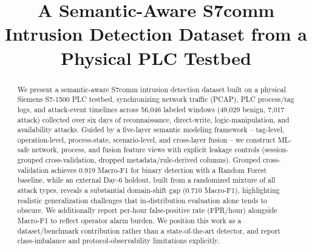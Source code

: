 \documentclass[conference]{IEEEtran}
\begin{document}
\title{A Semantic-Aware S7comm Intrusion Detection Dataset from a Physical PLC Testbed\\}

\author{
\and
{}
\and
{}
}

\maketitle

\begin{abstract}
We present a semantic-aware S7comm intrusion detection dataset built on a physical Siemens S7-1500 PLC testbed, synchronizing network traffic (PCAP), PLC process/tag logs, and attack-event timelines across 56{,}046 labeled windows (49{,}029 benign, 7{,}017 attack) collected over six days of reconnaissance, direct-write, logic-manipulation, and availability attacks. Guided by a five-layer semantic modeling framework -- tag-level, operation-level, process-state, scenario-level, and cross-layer fusion -- we construct ML-safe network, process, and fusion feature views with explicit leakage controls (session-grouped cross-validation, dropped metadata/rule-derived columns). Grouped cross-validation achieves 0.919 Macro-F1 for binary detection with a Random Forest baseline, while an external Day-6 holdout, built from a randomized mixture of all attack types, reveals a substantial domain-shift gap (0.710 Macro-F1), highlighting realistic generalization challenges that in-distribution evaluation alone tends to obscure. We additionally report per-hour false-positive rate (FPR/hour) alongside Macro-F1 to reflect operator alarm burden. We position this work as a dataset/benchmark contribution rather than a state-of-the-art detector, and report class-imbalance and protocol-observability limitations explicitly.
\end{abstract}
\end{document}
